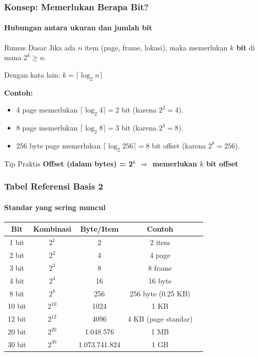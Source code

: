 \documentclass[t,aspectratio=169,xcolor=dvipsnames]{beamer}
\begin{document}
\begin{frame}
    \frametitle{Konsep: Memerlukan Berapa Bit?}
    \framesubtitle{Hubungan antara ukuran dan jumlah bit}
    \small
    \begin{block}{Rumus Dasar}
        Jika ada $n$ item (page, frame, lokasi), maka memerlukan \textbf{$k$ bit} di mana $2^k \geq n$.

        Dengan kata lain: $k = \lceil \log_2 n \rceil$
    \end{block}

    \vspace{0.2cm}
    \textbf{Contoh:}
    \begin{itemize}
        \item 4 page memerlukan $\lceil \log_2 4 \rceil = 2$ bit (karena $2^2 = 4$).
        \item 8 page memerlukan $\lceil \log_2 8 \rceil = 3$ bit (karena $2^3 = 8$).
        \item 256 byte page memerlukan $\lceil \log_2 256 \rceil = 8$ bit offset (karena $2^8 = 256$).
    \end{itemize}

    \begin{exampleblock}{Tip Praktis}
        \textbf{Offset (dalam bytes) = 2$^k$ $\Rightarrow$ memerlukan $k$ bit offset}
    \end{exampleblock}
\end{frame}

\begin{frame}
    \frametitle{Tabel Referensi Basis 2}
    \framesubtitle{Standar yang sering muncul}
    \small
    \begin{table}[]
        \centering
        \begin{tabular}{|c|c|c|c|c|}
            \hline
            \textbf{Bit} & \textbf{Kombinasi} & \textbf{Byte/Item} & \textbf{Contoh} \\
            \hline
            1 bit & $2^1$ & 2 & 2 item \\
            \hline
            2 bit & $2^2$ & 4 & 4 page \\
            \hline
            3 bit & $2^3$ & 8 & 8 frame \\
            \hline
            4 bit & $2^4$ & 16 & 16 byte \\
            \hline
            8 bit & $2^8$ & 256 & 256 byte (0.25 KB) \\
            \hline
            10 bit & $2^{10}$ & 1024 & 1 KB \\
            \hline
            12 bit & $2^{12}$ & 4096 & 4 KB (page standar) \\
            \hline
            20 bit & $2^{20}$ & 1.048.576 & 1 MB \\
            \hline
            30 bit & $2^{30}$ & 1.073.741.824 & 1 GB \\
            \hline
        \end{tabular}
    \end{table}
\end{frame}
\end{document}
